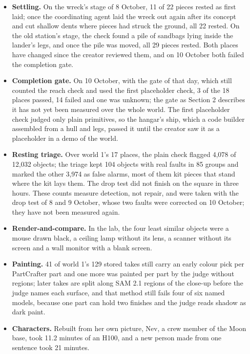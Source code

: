 \begin{itemize}
\tightlist
\item
  \textbf{Settling.} On the wreck's stage of 8 October, 11 of 22 pieces rested as first laid; once the coordinating agent laid the wreck out again after its concept and cut shallow dents where pieces had struck the ground, all 22 rested. On the old station's stage, the check found a pile of sandbags lying inside the lander's legs, and once the pile was moved, all 29 pieces rested. Both places have changed since the creator reviewed them, and on 10 October both failed the completion gate.
\item
  \textbf{Completion gate.} On 10 October, with the gate of that day, which still counted the reach check and used the first placeholder check, 3 of the 18 places passed, 14 failed and one was unknown; the gate as Section 2 describes it has not yet been measured over the whole world. The first placeholder check judged only plain primitives, so the hangar's ship, which a code builder assembled from a hull and legs, passed it until the creator saw it as a placeholder in a demo of the world.
\item
  \textbf{Resting triage.} Over world 1's 17 places, the plain check flagged 4,078 of 12,032 objects; the triage kept 104 objects with real faults in 85 groups and marked the other 3,974 as false alarms, most of them kit pieces that stand where the kit lays them. The drop test did not finish on the square in three hours. These counts measure detection, not repair, and were taken with the drop test of 8 and 9 October, whose two faults were corrected on 10 October; they have not been measured again.
\item
  \textbf{Render-and-compare.} In the lab, the four least similar objects were a mouse drawn black, a ceiling lamp without its lens, a scanner without its screen and a wall monitor with a blank screen.
\item
  \textbf{Painting.} 41 of world 1's 129 stored takes still carry an early colour pick per PartCrafter part and one more was painted per part by the judge without regions; later takes are split along SAM 2.1 regions of the close-up before the judge names each surface, and that method still fails four of six named models, because one part can hold two finishes and the judge reads shadow as dark paint.
\item
  \textbf{Characters.} Rebuilt from her own picture, Nev, a crew member of the Moon base, took 11.2 minutes of an H100, and a new person made from one sentence took 21 minutes.
\end{itemize}


